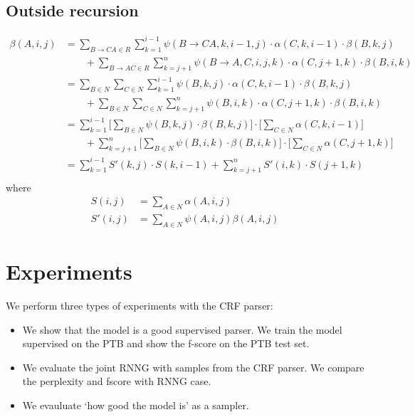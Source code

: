\subsection{Outside recursion}
\begin{align*}
    \beta(A, i, j) &= \sum_{B \to C A \in R} \sum_{k=1}^{i-1} \psi(B \to C A, k, i-1, j) \cdot \alpha(C, k, i-1) \cdot \beta(B, k, j) \\
            &\qquad + \sum_{B \to A C \in R} \sum_{k=j+1}^{n} \psi(B \to A, C, i, j, k) \cdot \alpha(C, j+1, k) \cdot \beta(B, i, k) \\
        &= \sum_{B \in N} \sum_{C \in N} \sum_{k=1}^{i-1} \psi(B, k, j) \cdot \alpha(C, k, i-1) \cdot \beta(B, k, j) \\
            &\qquad + \sum_{B \in N} \sum_{C \in N} \sum_{k=j+1}^{n} \psi(B, i, k) \cdot \alpha(C, j+1, k) \cdot \beta(B, i, k) \\
        &=  \sum_{k=1}^{i-1}  \Bigg[ \sum_{B \in N} \psi(B, k, j)  \cdot \beta(B, k, j) \Bigg] \cdot \Bigg[ \sum_{C \in N} \alpha(C, k, i-1) \Bigg] \\
            &\qquad + \sum_{k=j+1}^{n}  \Bigg[ \sum_{B \in N}  \psi(B, i, k) \cdot \beta(B, i, k) \Bigg] \cdot  \Bigg[ \sum_{C \in N} \alpha(C, j+1, k) \Bigg] \\
        &=  \sum_{k=1}^{i-1}  S'(k, j) \cdot S(k, i-1) + \sum_{k=j+1}^{n} S'(i, k) \cdot  S(j+1, k) \\
\end{align*}
where
\begin{align*}
    S(i, j) &= \sum_{A \in N} \alpha(A, i, j) \\
    S'(i, j) &= \sum_{A \in N} \psi(A, i, j) \beta(A, i, j)
\end{align*}

\section{Experiments}
We perform three types of experiments with the CRF parser:
\begin{itemize}
  \item We show that the model is a good supervised parser. We train the model supervised on the PTB and show the f-score on the PTB test set.
  \item We evaluate the joint RNNG with samples from the CRF parser. We compare the perplexity and fscore with RNNG case.
  \item We evauluate `how good the model is' as a sampler.
\end{itemize}

